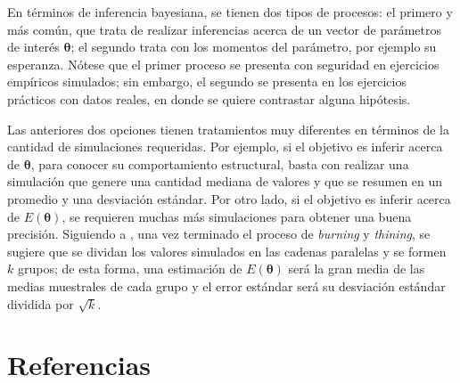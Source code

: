 \documentclass[
  10pt,
  spanish,
]{book}
\theoremstyle{definition}
\theoremstyle{definition}
\theoremstyle{definition}
\theoremstyle{definition}
\theoremstyle{remark}
\begin{document}
En términos de inferencia bayesiana, se tienen dos tipos de procesos: el primero y más común, que trata de realizar inferencias acerca de un vector de parámetros de interés \(\boldsymbol \theta\); el segundo trata con los momentos del parámetro, por ejemplo su esperanza. Nótese que el primer proceso se presenta con seguridad en ejercicios empíricos simulados; sin embargo, el segundo se presenta en los ejercicios prácticos con datos reales, en donde se quiere contrastar alguna hipótesis.

Las anteriores dos opciones tienen tratamientos muy diferentes en términos de la cantidad de simulaciones requeridas. Por ejemplo, si el objetivo es inferir acerca de \(\boldsymbol \theta\), para conocer su comportamiento estructural, basta con realizar una simulación que genere una cantidad mediana de valores y que se resumen en un promedio y una desviación estándar. Por otro lado, si el objetivo es inferir acerca de \(E(\boldsymbol \theta)\), se requieren muchas más simulaciones para obtener una buena precisión. Siguiendo a \citet{GelShir2010}, una vez terminado el proceso de \emph{burning} y \emph{thining}, se sugiere que se dividan los valores simulados en las cadenas paralelas y se formen \(k\) grupos; de esta forma, una estimación de \(E(\boldsymbol \theta)\) será la gran media de las medias muestrales de cada grupo y el error estándar será su desviación estándar dividida por \(\sqrt{k}\).

\hypertarget{referencias}{%
\chapter*{Referencias}\label{referencias}}

  
\end{document}
